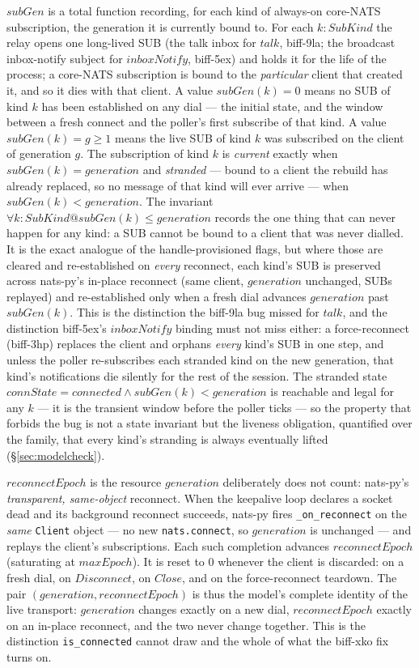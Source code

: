 \documentclass[a4paper,10pt,fleqn]{article}
\begin{document}
$subGen$ is a total function recording, for each kind of always-on
core-NATS subscription, the generation it is currently bound to.  For each
$k : SubKind$ the relay opens one long-lived SUB (the talk inbox for
$talk$, biff-9la; the broadcast inbox-notify subject for $inboxNotify$,
biff-5ex) and holds it for the life of the process; a core-NATS
subscription is bound to the \emph{particular} client that created it, and
so it dies with that client.  A value $subGen(k) = 0$ means no SUB of kind
$k$ has been established on any dial --- the initial state, and the
window between a fresh connect and the poller's first subscribe of that
kind.  A value $subGen(k) = g \geq 1$ means the live SUB of kind $k$ was
subscribed on the client of generation $g$.  The subscription of kind $k$
is \emph{current} exactly when $subGen(k) = generation$ and
\emph{stranded} --- bound to a client the rebuild has already replaced, so
no message of that kind will ever arrive --- when $subGen(k) <
generation$.  The invariant $\forall k : SubKind @ subGen(k) \leq
generation$ records the one thing that can never happen for any kind: a
SUB cannot be bound to a client that was never dialled.  It is the exact
analogue of the handle-provisioned flags, but where those are cleared and
re-established on \emph{every} reconnect, each kind's SUB is preserved
across nats-py's in-place reconnect (same client, $generation$ unchanged,
SUBs replayed) and re-established only when a fresh dial advances
$generation$ past $subGen(k)$.  This is the distinction the biff-9la bug
missed for $talk$, and the distinction biff-5ex's $inboxNotify$ binding
must not miss either: a force-reconnect (biff-3hp) replaces the client and
orphans \emph{every} kind's SUB in one step, and unless the poller
re-subscribes each stranded kind on the new generation, that kind's
notifications die silently for the rest of the session.  The stranded
state $connState = connected \land subGen(k) < generation$ is reachable
and legal for any $k$ --- it is the transient window before the poller
ticks --- so the property that forbids the bug is not a state invariant
but the liveness obligation, quantified over the family, that every
kind's stranding is always eventually lifted (\S\ref{sec:modelcheck}).

$reconnectEpoch$ is the resource $generation$ deliberately does not
count: nats-py's \emph{transparent, same-object} reconnect.  When the
keepalive loop declares a socket dead and its background reconnect
succeeds, nats-py fires \texttt{\_on\_reconnect} on the \emph{same}
\texttt{Client} object --- no new \texttt{nats.connect}, so $generation$
is unchanged --- and replays the client's subscriptions.  Each such
completion advances $reconnectEpoch$ (saturating at $maxEpoch$).  It is
reset to $0$ whenever the client is discarded: on a fresh dial, on
$Disconnect$, on $Close$, and on the force-reconnect teardown.  The pair
$(generation, reconnectEpoch)$ is thus the model's complete identity of
the live transport: $generation$ changes exactly on a new dial,
$reconnectEpoch$ exactly on an in-place reconnect, and the two never
change together.  This is the distinction \texttt{is\_connected} cannot
draw and the whole of what the biff-xko fix turns on.
\end{document}
